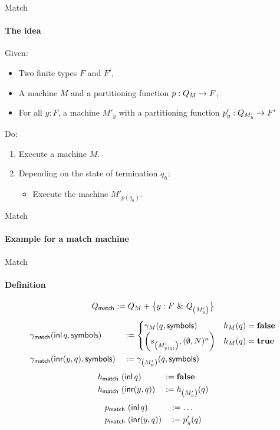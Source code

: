 \begin{frame}{Match}
  \framesubtitle{The idea}
  Given:
  \begin{itemize}
    \item Two finite types $F$ and $F'$,
    \item A machine $M$ and a partitioning function $p : Q_M \rightarrow F$,
    \item For all $y:F$, a machine $M'_y$ with a partitioning function $p'_y : Q_{M'_y} \rightarrow F'$
  \end{itemize}
  Do:
  \begin{enumerate}
    \item Execute a machine $M$.
    \item Depending on the state of termination $q_h$:
      \begin{itemize}
        \item Execute the machine $M'_{p(q_h)}$.
      \end{itemize}
  \end{enumerate}
\end{frame}


\begin{frame}{Match}
  \framesubtitle{Example for a match machine}
  
\end{frame}

\begin{frame}{Match}
  \framesubtitle{Definition}
  \footnotesize
  $$Q_{\textsf{match}} := Q_M + \bigl\{ y:F~{\&}~Q_{ \left( M'_{y} \right) } \bigr \}$$
  \begin{alignat*}{2}
    \gamma_{\textsf{match}} & (\operatorname{\textsf{inl}} q, \textsf{symbols}) &&:=
    \begin{cases}
      \gamma_{M}(q, \textsf{symbols})                                & h_M(q) = \mathbf{false} \\
      \left( s_{\left(M'_{p(q)}\right)}, (\emptyset, N)^n \right)  & h_M(q) = \mathbf{true}
    \end{cases} \\
    \gamma_{\textsf{match}} & (\operatorname{\textsf{inr}} (y, q), \textsf{symbols}) &&:= \gamma_{\left({M'_y}\right)}(q, \textsf{symbols})
  \end{alignat*}
  \begin{alignat*}{3}
    h_{\textsf{match}} &~ (\operatorname{\textsf{inl}}      q) &&:= \mathbf{false} \\
    h_{\textsf{match}} &~ (\operatorname{\textsf{inr}} (y, q)) &&:= h_{\left( M'_y \right)}(q)
  \end{alignat*}
  \begin{alignat*}{3}
    p_{\textsf{match}} &~ (\operatorname{\textsf{inl}}      q) &&:= \dots \\
    p_{\textsf{match}} &~ (\operatorname{\textsf{inr}} (y, q)) &&:= p'_y(q)
  \end{alignat*}
\end{frame}

